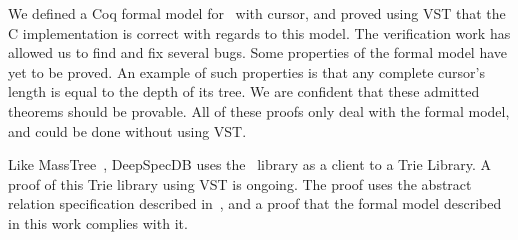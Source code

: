 We defined a Coq formal model for \btrees\ with cursor, and proved using VST that the C implementation is correct with regards to this model.
The verification work has allowed us to find and fix several bugs.
Some properties of the formal model have yet to be proved.
An example of such properties is that any complete cursor's length is equal to the depth of its tree.
We are confident that these admitted theorems should be provable.
All of these proofs only deal with the formal model, and could be done without using VST.

Like MassTree~\cite{masstree}, DeepSpecDB uses the \btrees\ library as a client to a Trie Library. A proof of this Trie library using VST is ongoing.
The proof uses the abstract relation specification described in~\cite{brian}, and a proof that the formal model described in this work complies with it.

